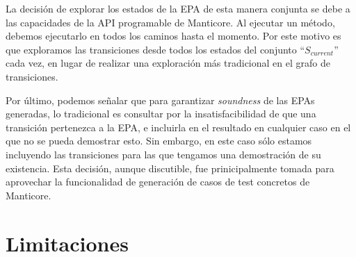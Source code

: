 La decisión de explorar los estados de la EPA de esta manera conjunta se debe a las capacidades de la API programable de Manticore.
Al ejecutar un método, debemos ejecutarlo en todos los caminos hasta el momento.
Por este motivo es que exploramos las transiciones desde todos los estados del conjunto ``$S_{current}$'' cada vez, en lugar de realizar una exploración más tradicional en el grafo de transiciones.

Por último, podemos señalar que para garantizar \textit{soundness} de las EPAs generadas, lo tradicional es consultar por la insatisfacibilidad de que una transición pertenezca a la EPA, e incluirla en el resultado en cualquier caso en el que no se pueda demostrar esto.
Sin embargo, en este caso sólo estamos incluyendo las transiciones para las que tengamos una demostración de su existencia.
Esta decisión, aunque discutible, fue prinicipalmente tomada para aprovechar la funcionalidad de generación de casos de test concretos de Manticore.




\section{Limitaciones}
\label{sec:subaproximacion}

